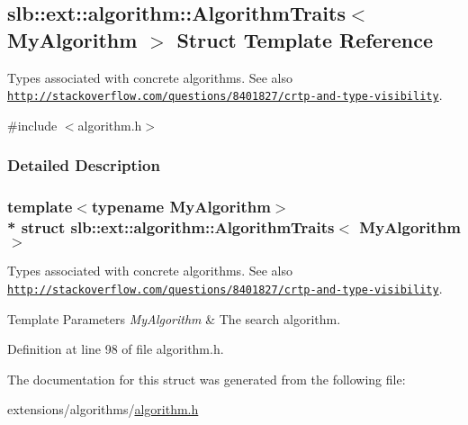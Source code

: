 \hypertarget{classslb_1_1ext_1_1algorithm_1_1AlgorithmTraits}{}\subsection{slb\+:\+:ext\+:\+:algorithm\+:\+:Algorithm\+Traits$<$ My\+Algorithm $>$ Struct Template Reference}
\label{classslb_1_1ext_1_1algorithm_1_1AlgorithmTraits}


Types associated with concrete algorithms. See also \href{http://stackoverflow.com/questions/8401827/crtp-and-type-visibility}{\tt http\+://stackoverflow.\+com/questions/8401827/crtp-\/and-\/type-\/visibility}.  




{\ttfamily \#include $<$algorithm.\+h$>$}



\subsubsection{Detailed Description}
\subsubsection*{template$<$typename My\+Algorithm$>$\\*
struct slb\+::ext\+::algorithm\+::\+Algorithm\+Traits$<$ My\+Algorithm $>$}

Types associated with concrete algorithms. See also \href{http://stackoverflow.com/questions/8401827/crtp-and-type-visibility}{\tt http\+://stackoverflow.\+com/questions/8401827/crtp-\/and-\/type-\/visibility}. 


\begin{DoxyTemplParams}{Template Parameters}
{\em My\+Algorithm} & The search algorithm. \\
\hline
\end{DoxyTemplParams}


Definition at line 98 of file algorithm.\+h.



The documentation for this struct was generated from the following file\+:\begin{DoxyCompactItemize}
\item 
extensions/algorithms/\hyperlink{algorithm_8h}{algorithm.\+h}\end{DoxyCompactItemize}
